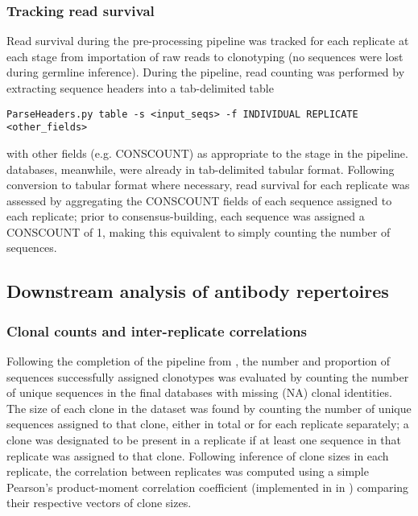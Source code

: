 \subsubsection{Tracking read survival}
\label{sec:methods_comp_igpreproc_readsurv}

Read survival during the pre-processing pipeline was tracked for each replicate at each stage from importation of raw reads to clonotyping (no sequences were lost during germline inference). During the  pipeline, read counting was performed by extracting sequence headers into a tab-delimited table

\begin{lstlisting}
ParseHeaders.py table -s <input_seqs> -f INDIVIDUAL REPLICATE <other_fields>
\end{lstlisting}  

\noindent with other fields (e.g. CONSCOUNT) as appropriate to the stage in the pipeline.  databases, meanwhile, were already in tab-delimited tabular format. Following conversion to tabular format where necessary, read survival for each replicate was assessed by aggregating the CONSCOUNT fields of each sequence assigned to each replicate; prior to consensus-building, each sequence was assigned a CONSCOUNT of 1, making this equivalent to simply counting the number of sequences.

\subsection{Downstream analysis of antibody repertoires}
\label{sec:methods_comp_igdownstream}

\subsubsection{Clonal counts and inter-replicate correlations}
\label{sec:methods_comp_igdownstream_clones}

Following the completion of the pipeline from , the number and proportion of sequences successfully assigned clonotypes was evaluated by counting the number of unique sequences in the final  databases with missing (NA) clonal identities. The size of each clone in the dataset was found by counting the number of unique sequences assigned to that clone, either in total or for each replicate separately; a clone was designated to be present in a replicate if at least one sequence in that replicate was assigned to that clone. Following inference of clone sizes in each replicate, the correlation between replicates was computed using a simple Pearson's product-moment correlation coefficient (implemented in  in ) comparing their respective vectors of clone sizes.

